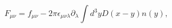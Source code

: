 \begin{equation}
\label{F}
F_{\mu\nu}=f_{\mu\nu}-2\pi\epsilon_{\mu\nu\lambda}
\partial_\lambda\int d^3y D(x-y)n(y),
\end{equation}

